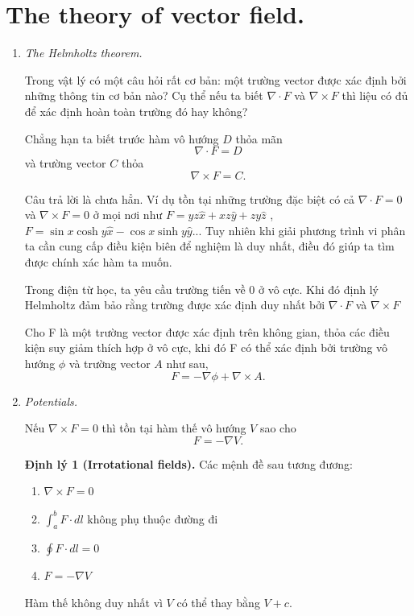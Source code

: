 \section{The theory of vector field.}
\begin{enumerate}

\item \textit{The Helmholtz theorem.}

Trong vật lý có một câu hỏi rất cơ bản: một trường vector được xác định bởi những thông tin cơ bản nào? 
Cụ thể nếu ta biết $\nabla \cdot F$ và $\nabla \times F$ thì liệu có đủ để xác định hoàn toàn trường đó hay không?

Chẳng hạn ta biết trước hàm vô hướng $D$ thỏa mãn
\[
\nabla \cdot F = D
\]
và trường vector $C$ thỏa
\[
\nabla \times F = C.
\]

Câu trả lời là chưa hẳn. Ví dụ tồn tại những trường đặc biệt có cả $\nabla \cdot F = 0$ và $\nabla \times F = 0$ ở mọi nơi như $F = yz\hat{x} + xz\hat{y} + zy\hat{z}$ , $F = \sin{x}\cosh{y}\hat{x} - \cos{x}\sinh{y}\hat{y}$...
Tuy nhiên khi giải phương trình vi phân ta cần cung cấp điều kiện biên để nghiệm là duy nhất, điều đó giúp ta tìm được chính xác hàm ta muốn.

Trong điện từ học, ta yêu cầu trường tiến về $0$ ở vô cực. Khi đó định lý Helmholtz đảm bảo rằng trường được xác định duy nhất bởi $\nabla \cdot F$ và $\nabla \times F$

Cho F là một trường vector được xác định trên không gian, thỏa các điều kiện suy giảm thích hợp ở vô cực, khi đó F có thể xác định bởi trường vô hướng $\phi$ và trường vector $A$ như sau,
\[
F = -\nabla \phi + \nabla \times A.
\]

\item \textit{Potentials.}

Nếu $\nabla \times F = 0$ thì tồn tại hàm thế vô hướng $V$ sao cho
\[
F = -\nabla V.
\]

\textbf{Định lý 1 (Irrotational fields).} Các mệnh đề sau tương đương:

\begin{enumerate}
\item[(a)] $\nabla \times F = 0$
\item[(b)] $\displaystyle \int_a^b F \cdot dl$ không phụ thuộc đường đi
\item[(c)] $\displaystyle \oint F \cdot dl = 0$
\item[(d)] $F = -\nabla V$
\end{enumerate}

Hàm thế không duy nhất vì $V$ có thể thay bằng $V+c$.


\end{enumerate}
